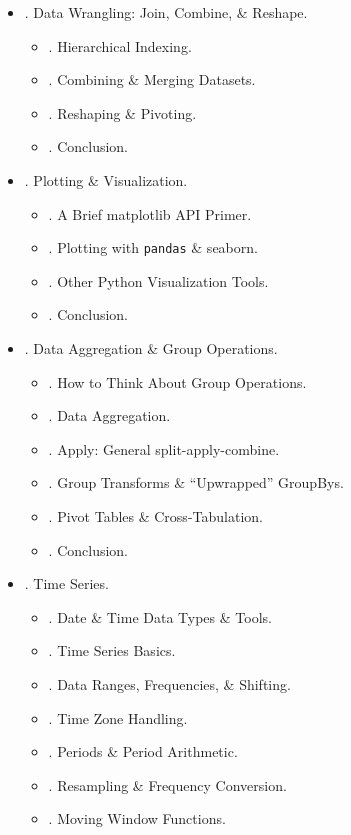 \documentclass{article}
\begin{document}
\begin{enumerate}
\begin{itemize}
\begin{itemize}
		\end{itemize}
		\item {. Data Wrangling: Join, Combine, \& Reshape.}
		\begin{itemize}
			\item {. Hierarchical Indexing.}
			\item {. Combining \& Merging Datasets.}
			\item {. Reshaping \& Pivoting.}
			\item {. Conclusion.}
		\end{itemize}
		\item {. Plotting \& Visualization.}
		\begin{itemize}
			\item {. A Brief matplotlib API Primer.}
			\item {. Plotting with {\tt pandas} \& seaborn.}
			\item {. Other Python Visualization Tools.}
			\item {. Conclusion.}
		\end{itemize}
		\item {. Data Aggregation \& Group Operations.}
		\begin{itemize}
			\item {. How to Think About Group Operations.}
			\item {. Data Aggregation.}
			\item {. Apply: General split-apply-combine.}
			\item {. Group Transforms \& ``Upwrapped'' GroupBys.}
			\item {. Pivot Tables \& Cross-Tabulation.}
			\item {. Conclusion.}
		\end{itemize}
		\item {. Time Series.}
		\begin{itemize}
			\item {. Date \& Time Data Types \& Tools.}
			\item {. Time Series Basics.}
			\item {. Data Ranges, Frequencies, \& Shifting.}
			\item {. Time Zone Handling.}
			\item {. Periods \& Period Arithmetic.}
			\item {. Resampling \& Frequency Conversion.}
			\item {. Moving Window Functions.}

\end{itemize}
\end{itemize}
\end{enumerate}
\end{document}
